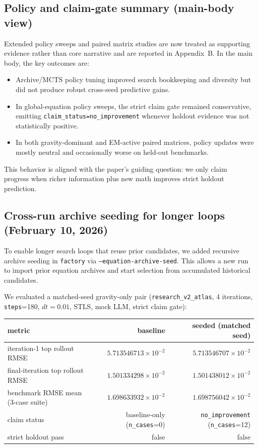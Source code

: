 \documentclass[11pt]{article}
\begin{document}
\subsection{Policy and claim-gate summary (main-body view)}
Extended policy sweeps and paired matrix studies are now treated as supporting evidence rather than core narrative and are reported in Appendix~B.
In the main body, the key outcomes are:
\begin{itemize}
\item Archive/MCTS policy tuning improved search bookkeeping and diversity but did not produce robust cross-seed predictive gains.
\item In global-equation policy sweeps, the strict claim gate remained conservative, emitting \texttt{claim\_status=no\_improvement} whenever holdout evidence was not statistically positive.
\item In both gravity-dominant and EM-active paired matrices, policy updates were mostly neutral and occasionally worse on held-out benchmarks.
\end{itemize}
This behavior is aligned with the paper's guiding question: we only claim progress when richer information plus new math improves strict holdout prediction.

\subsection{Cross-run archive seeding for longer loops (February 10, 2026)}
To enable longer search loops that reuse prior candidates, we added recursive archive seeding in \texttt{factory} via \texttt{--equation-archive-seed}. This allows a new run to import prior equation archives and start selection from accumulated historical candidates.

We evaluated a matched-seed gravity-only pair (\texttt{research\_v2\_atlas}, 4 iterations, \texttt{steps}=180, $dt=0.01$, STLS, mock LLM, strict claim gate):
\begin{center}
\begin{tabular}{lrr}
\hline
metric & baseline & seeded (matched seed) \\
\hline
iteration-1 top rollout RMSE & $5.713546713\times 10^{-2}$ & $5.713546707\times 10^{-2}$ \\
final-iteration top rollout RMSE & $1.501334298\times 10^{-2}$ & $1.501438012\times 10^{-2}$ \\
benchmark RMSE mean (3-case suite) & $1.698633932\times 10^{-2}$ & $1.698756042\times 10^{-2}$ \\
claim status & baseline-only (\texttt{n\_cases}=0) & \texttt{no\_improvement} (\texttt{n\_cases}=12) \\
strict holdout pass & false & false \\
\hline
\end{tabular}
\end{center}
\end{document}
